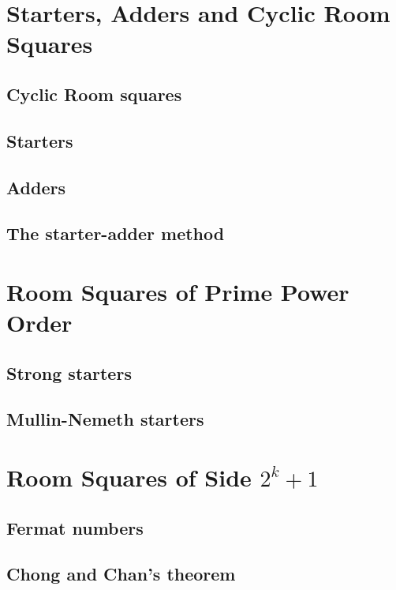 \documentclass[a4paper, draft]{book}
\begin{document}
\chapter{Starters, Adders and Cyclic Room Squares}
  \label{ch:starter-adder}
  \section{Cyclic Room squares}
    
  \section{Starters}
    
  \section{Adders}
    
  \section{The starter-adder method}
    

\chapter{Room Squares of Prime Power Order}
  \label{ch:prime-power}
  \section{Strong starters}
    \label{sec:strong-starters}
    
  \section{Mullin-Nemeth starters}
    \label{sec:mullin-nemeth}
    

\chapter{Room Squares of Side $2^{k} + 1$}
  \label{ch:trouble-fermat}
  \section{Fermat numbers}
    \label{sec:fermat-numbers}
    
  \section{Chong and Chan's theorem}
    \label{sec:chong-chan}
    
\end{document}
